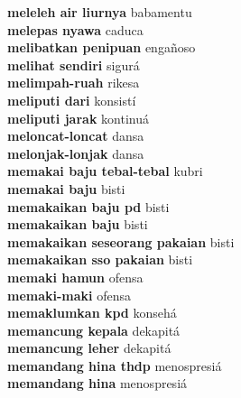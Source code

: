 \textbf{ meleleh air liurnya  } babamentu \\
\textbf{ melepas nyawa  } caduca \\
\textbf{ melibatkan penipuan  } engañoso \\
\textbf{ melihat sendiri  } sigurá \\
\textbf{ melimpah-ruah  } rikesa \\
\textbf{ meliputi dari  } konsistí \\
\textbf{ meliputi jarak  } kontinuá \\
\textbf{ meloncat-loncat  } dansa \\
\textbf{ melonjak-lonjak  } dansa \\
\textbf{ memakai baju tebal-tebal  } kubri \\
\textbf{ memakai baju  } bisti \\
\textbf{ memakaikan baju pd  } bisti \\
\textbf{ memakaikan baju  } bisti \\
\textbf{ memakaikan seseorang pakaian  } bisti \\
\textbf{ memakaikan sso pakaian  } bisti \\
\textbf{ memaki hamun  } ofensa \\
\textbf{ memaki-maki  } ofensa \\
\textbf{ memaklumkan kpd  } konsehá \\
\textbf{ memancung kepala  } dekapitá \\
\textbf{ memancung leher  } dekapitá \\
\textbf{ memandang hina thdp  } menospresiá \\
\textbf{ memandang hina  } menospresiá \\
